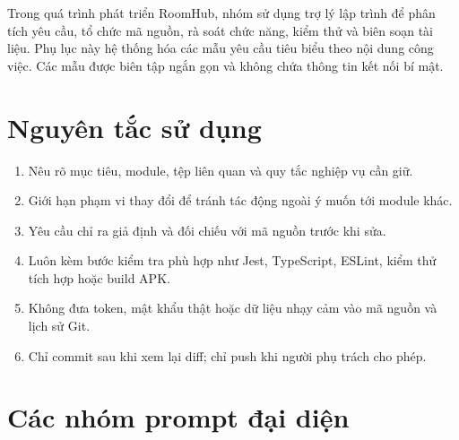 Trong quá trình phát triển RoomHub, nhóm sử dụng trợ lý lập trình để phân tích yêu cầu, tổ chức mã nguồn, rà soát chức năng, kiểm thử và biên soạn tài liệu. Phụ lục này hệ thống hóa các mẫu yêu cầu tiêu biểu theo nội dung công việc. Các mẫu được biên tập ngắn gọn và không chứa thông tin kết nối bí mật.

\section{Nguyên tắc sử dụng}

\begin{enumerate}
  \item Nêu rõ mục tiêu, module, tệp liên quan và quy tắc nghiệp vụ cần giữ.
  \item Giới hạn phạm vi thay đổi để tránh tác động ngoài ý muốn tới module khác.
  \item Yêu cầu chỉ ra giả định và đối chiếu với mã nguồn trước khi sửa.
  \item Luôn kèm bước kiểm tra phù hợp như Jest, TypeScript, ESLint, kiểm thử tích hợp hoặc build APK.
  \item Không đưa token, mật khẩu thật hoặc dữ liệu nhạy cảm vào mã nguồn và lịch sử Git.
  \item Chỉ commit sau khi xem lại diff; chỉ push khi người phụ trách cho phép.
\end{enumerate}

\section{Các nhóm prompt đại diện}

